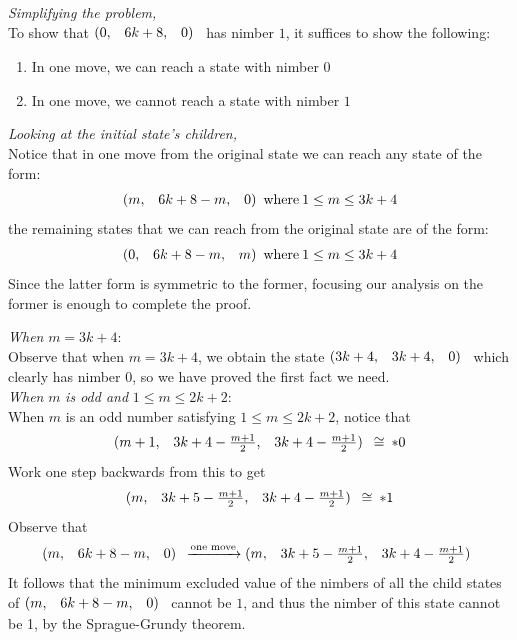 \documentclass{article}
\makeatletter
\newcommand{\game}[3]{\begin{array}{@{}*6r}(#1, & #2, & #3)\end{array}}
\newcommand{\gcong}{\cong\:}
\makeatother
\begin{document}
\bigskip
\textit{Simplifying the problem,}\\
To show that $\game{0}{6k+8}{0}$ has nimber $1$, it suffices to show
the following:
\begin{enumerate}
  \item In one move, we can reach a state with nimber $0$
  \item In one move, we cannot reach a state with nimber $1$
\end{enumerate}

\bigskip
\textit{Looking at the initial state's children,}\\
Notice that in one move from the original state we can reach any state
of the form:
\begin{equation*}
  \game{m}{6k+8-m}{0} \text{where} \: 1 \leq m \leq 3k + 4 
  \end{equation*}
the remaining states that we can reach from the original state are of
the form:
\begin{equation*}
  \game{0}{6k+8-m}{m} \text{where} \: 1 \leq m \leq 3k + 4
\end{equation*}
Since the latter form is symmetric to the former, focusing our analysis
on the former is enough to complete the proof.

\bigskip
\textit{When} $m = 3k + 4$:\\
Observe that when $m = 3k + 4$, we obtain the state
$\game{3k+4}{3k+4}{0}$ which clearly has nimber $0$,
so we have proved the first fact we need. \\

\bigskip
\textit{When} $m$ \textit{is odd and} $1 \leq m \leq 2k + 2$:\\
When $m$ is an odd number satisfying $1 \leq m \leq 2k + 2$,
notice that
\begin{equation*}
  \game{m+1}{3k+4-\frac{m+1}{2}}{3k+4-\frac{m+1}{2}} \gcong *0
\end{equation*}
Work one step backwards from this to get
\begin{equation*}
  \game{m}{3k+5-\frac{m+1}{2}}{3k+4-\frac{m+1}{2}} \gcong *1
\end{equation*}
Observe that
\begin{equation*}
  \game{m}{6k+8-m}{0} \xrightarrow{\text{one move}}
  \game{m}{3k+5-\frac{m+1}{2}}{3k+4-\frac{m+1}{2}}
\end{equation*}
It follows that the minimum excluded value of the nimbers of
all the child states of $\game{m}{6k+8-m}{0}$ cannot be $1$, and
thus the nimber of this state cannot be 1, by the Sprague-Grundy
theorem.
\end{document}
